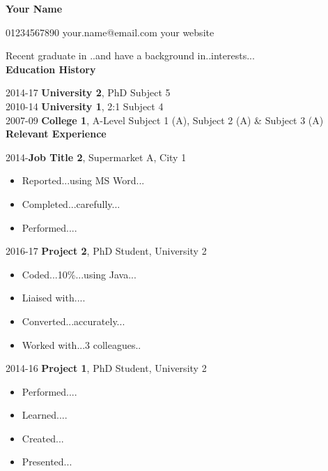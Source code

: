 \documentclass[11pt]{report}
\begin{document}
\begin{center}	
	\begin{huge}
	\textbf{Your Name} \\
	\end{huge}
	01234567890 \qquad your.name@email.com \qquad your website
\end{center}

Recent graduate in ..and have a background in..interests...\\


\textbf{Education History}
\newline

2014-17 \qquad \textbf{University 2}, PhD Subject 5 \\
2010-14 \qquad \textbf{University 1}, 2:1 Subject 4 \\
2007-09 \qquad \textbf{College 1}, A-Level Subject 1 (A), Subject 2 (A) \& Subject 3 (A) \\

\textbf{Relevant Experience} 
\newline 

2014-\space\space  \qquad \textbf{Job Title 2}, Supermarket A, City 1 \\
\begin{itemize}
	\item Reported...using MS Word... 
	\item Completed...carefully...  
	\item Performed.... 
	\newline
\end{itemize}

2016-17 \qquad \textbf{Project 2}, PhD Student, University 2  \\
\begin{itemize}
	\item Coded...10\%...using Java...  
	\item Liaised with....
	\item Converted...accurately...
	\item Worked with...3 colleagues..   
	\newline 
\end{itemize}	


2014-16 \qquad \textbf{Project 1}, PhD Student, University 2 \\
\begin{itemize}
	\item Performed.... 
	\item Learned....
	\item Created...
	\item Presented...  
	\newline 
\end{itemize}
\end{document}
